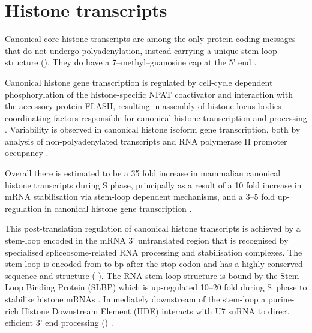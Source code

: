 \section{Histone transcripts}


  Canonical core histone transcripts are among the only protein coding messages
  that do not undergo polyadenylation,
  instead carrying a unique stem-loop structure ().
  They do have a 7--methyl--guanosine cap at the 5' end \citep{MarzluffNatRevGen2008}.

  Canonical histone gene transcription is regulated
  by cell-cycle dependent phosphorylation of the histone-specific NPAT coactivator
  and interaction with the accessory protein FLASH,
  resulting in assembly of histone locus bodies
  coordinating factors responsible for canonical histone transcription and processing
  \citep{MarzluffNatRevGen2008,RattrayMueller2012,Hoefig2014}.
  Variability is observed in canonical histone isoform gene transcription,
  both by analysis of non-polyadenylated transcripts \citep{YangGenomeBiol2011}
  and RNA polymerase II promoter occupancy \citep{Ederveen2011}.

  Overall there is estimated to be a 35 fold increase in mammalian
  canonical histone transcripts during S phase,
  principally as a result of a 10 fold increase in mRNA stabilisation
  via stem-loop dependent mechanisms,
  and a 3--5 fold up-regulation in canonical histone gene transcription \citep{HarrisMCB1991}.

  This post-translation regulation of canonical histone transcripts
  is achieved by a stem-loop encoded in the mRNA 3' untranslated region
  that is recognised by specialised spliceosome-related RNA
  processing and stabilisation complexes.
  The stem-loop is encoded from \StemLoopStart{} to \StemLoopEnd{} bp after the stop codon
  and has a highly conserved sequence and structure
  ( \citep{stem-loop-structure}).
  The RNA stem-loop structure is bound by the Stem-Loop Binding Protein (SLBP)
  which is up-regulated 10--20 fold during S~phase to stabilise
  histone mRNAs \citep{SLBP-regulation}.
  Immediately downstream of the stem-loop a purine-rich Histone Downstream Element (HDE)
  interacts with U7 snRNA to direct efficient 3' end
  processing () \citep{HDE-sequence}.

